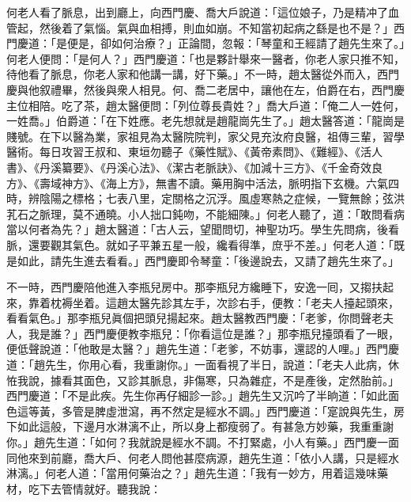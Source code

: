 何老人看了脈息，出到廳上，向西門慶、喬大戶說道：「這位娘子，乃是精冲了血管起，{}然後着了氣惱。氣與血相搏，則血如崩。{}不知當初起病之繇是也不是？」西門慶道：「是便是，卻如何治療？」正論間，忽報：「琴童和王經請了趙先生來了。」何老人便問：「是何人？」西門慶道：「也是夥計舉來一醫者，你老人家只推不知，待他看了脈息，你老人家和他講一講，好下藥。」不一時，趙太醫從外而入，西門慶與他叙禮畢，然後與衆人相見。何、喬二老居中，讓他在左，伯爵在右，西門慶主位相陪。吃了茶，趙太醫便問：「列位尊長貴姓？」喬大戶道：「俺二人一姓何，一姓喬。」伯爵道：「在下姓應。老先想就是趙龍崗先生了。」趙太醫答道：「龍崗是賤號。{}在下以醫為業，家祖見為太醫院院判，家父見充汝府良醫，祖傳三輩，習學醫術。{}每日攻習王叔和、東垣勿聽子《藥性賦》、《黃帝素問》、《難經》、《活人書》、《丹溪纂要》、《丹溪心法》、《潔古老脈訣》、《加減十三方》、《千金奇效良方》、《壽域神方》、《海上方》，無書不讀。藥用胸中活法，脈明指下玄機。六氣四時，辨陰陽之標格；七表八里，定關格之沉浮。{}風虛寒熱之症候，一覽無餘；弦洪芤石之脈理，莫不通曉。小人拙口鈍吻，不能細陳。」何老人聽了，道：「敢問看病當以何者為先？」趙太醫道：「古人云，望聞問切，神聖功巧。學生先問病，後看脈，還要觀其氣色。就如子平兼五星一般，{}纔看得準，庶乎不差。」何老人道：「既是如此，請先生進去看看。」西門慶即令琴童：「後邊說去，又請了趙先生來了。」

不一時，西門慶陪他進入李瓶兒房中。那李瓶兒方纔睡下，安逸一囘，{}又搊扶起來，靠着枕褥坐着。這趙太醫先診其左手，次診右手，便教：「老夫人擡起頭來，看看氣色。」那李瓶兒眞個把頭兒揚起來。趙太醫教西門慶：「老爹，你問聲老夫人，我是誰？」{}西門慶便教李瓶兒：「你看這位是誰？」那李瓶兒擡頭看了一眼，便低聲說道：「他敢是太醫？」趙先生道：「老爹，不妨事，還認的人哩。」{}西門慶道：「趙先生，你用心看，我重謝你。」一面看視了半日，說道：「老夫人此病，休恠我說，據看其面色，又診其脈息，非傷寒，只為雜症，不是產後，定然胎前。」西門慶道：「不是此疾。先生你再仔細診一診。」趙先生又沉吟了半晌道：「如此面色這等黃，多管是脾虛泄瀉，再不然定是經水不調。」西門慶道：「寔說與先生，房下如此這般，下邊月水淋漓不止，所以身上都瘦弱了。有甚急方妙藥，我重重謝你。」趙先生道：「如何？我就說是經水不調。不打緊處，小人有藥。」{}西門慶一面同他來到前廳，喬大戶、何老人問他甚麼病源，趙先生道：「依小人講，只是經水淋漓。」何老人道：「當用何藥治之？」趙先生道：「我有一妙方，用着這幾味藥材，吃下去管情就好。聽我說：

